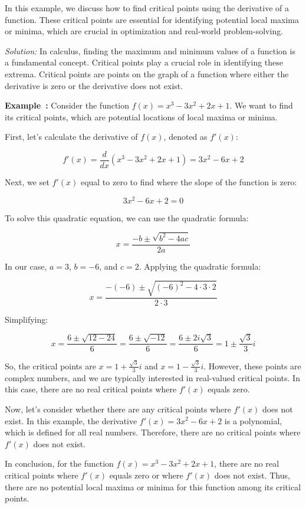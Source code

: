 \documentclass[a4paper,12pt]{book}
\newcounter{problem}
\newenvironment{solution}[1][]
{\par\noindent\textit{Solution:} \rmfamily}{\medskip}
\newcounter{example}
\newenvironment{example}[1][\theexample]
  {\refstepcounter{example}\par\medskip\noindent\textbf{Example~#1:} \rmfamily}
  {\medskip}
\begin{document}
In this example, we discuss how to find critical points using the derivative of a function. These critical points are essential for identifying potential local maxima or minima, which are crucial in optimization and real-world problem-solving.

\begin{solution}
In calculus, finding the maximum and minimum values of a function is a fundamental concept. Critical points play a crucial role in identifying these extrema. Critical points are points on the graph of a function where either the derivative is zero or the derivative does not exist.

\begin{example}
Consider the function $f(x) = x^3 - 3x^2 + 2x + 1$. We want to find its critical points, which are potential locations of local maxima or minima.

First, let's calculate the derivative of $f(x)$, denoted as $f'(x)$:

\[
f'(x) = \frac{d}{dx}(x^3 - 3x^2 + 2x + 1) = 3x^2 - 6x + 2
\]

Next, we set $f'(x)$ equal to zero to find where the slope of the function is zero:

\[
3x^2 - 6x + 2 = 0
\]

To solve this quadratic equation, we can use the quadratic formula:

\[
x = \frac{-b \pm \sqrt{b^2 - 4ac}}{2a}
\]

In our case, $a = 3$, $b = -6$, and $c = 2$. Applying the quadratic formula:

\[
x = \frac{-(-6) \pm \sqrt{(-6)^2 - 4 \cdot 3 \cdot 2}}{2 \cdot 3}
\]

Simplifying:

\[
x = \frac{6 \pm \sqrt{12 - 24}}{6} = \frac{6 \pm \sqrt{-12}}{6} = \frac{6 \pm 2i\sqrt{3}}{6} = 1 \pm \frac{\sqrt{3}}{3}i
\]

So, the critical points are $x = 1 + \frac{\sqrt{3}}{3}i$ and $x = 1 - \frac{\sqrt{3}}{3}i$. However, these points are complex numbers, and we are typically interested in real-valued critical points. In this case, there are no real critical points where $f'(x)$ equals zero.

Now, let's consider whether there are any critical points where $f'(x)$ does not exist. In this example, the derivative $f'(x) = 3x^2 - 6x + 2$ is a polynomial, which is defined for all real numbers. Therefore, there are no critical points where $f'(x)$ does not exist.

In conclusion, for the function $f(x) = x^3 - 3x^2 + 2x + 1$, there are no real critical points where $f'(x)$ equals zero or where $f'(x)$ does not exist. Thus, there are no potential local maxima or minima for this function among its critical points.
\end{example}
\end{solution}
\end{document}
